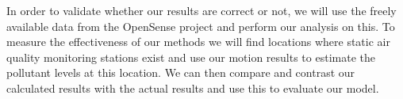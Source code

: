 \documentclass[12pt,a4paper,notitlepage]{article}
\begin{document}
In order to validate whether our results are correct or not, we will use the freely available data from the OpenSense project and perform our analysis on this. To measure the effectiveness of our methods we will find locations where static air quality monitoring stations exist and use our motion results to estimate the pollutant levels at this location. We can then compare and contrast our calculated results with the actual results and use this to evaluate our model. 



\end{document}
